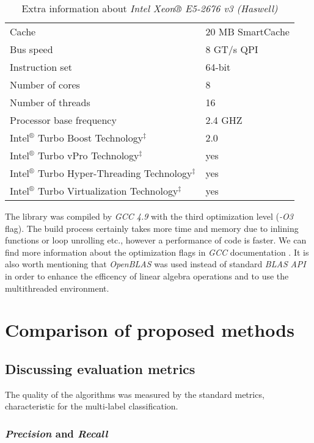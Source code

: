 \begin{table}[h]
\centering
\caption{Extra information about \textit{Intel Xeon® E5-2676 v3 (Haswell)}}
\label{tab:cpu}
    \begin{tabular}{l|l}
    & \\ \hline \hline
    Cache & 20 MB SmartCache \\
    Bus speed & 8 GT/s QPI \\
    Instruction set & 64-bit \\
    Number of cores & 8 \\
    Number of threads & 16 \\
    Processor base frequency & 2.4 GHZ \\
    Intel$^{®}$ Turbo Boost Technology$^{‡}$ & 2.0 \\
    Intel$^{®}$ Turbo vPro Technology$^{‡}$ & yes \\ 
    Intel$^{®}$ Turbo Hyper-Threading Technology$^{‡}$ & yes \\
    Intel$^{®}$ Turbo Virtualization Technology$^{‡}$ & yes
    \end{tabular}
\end{table}

The library was compiled by \textit{GCC 4.9} with the third optimization level (\textit{-O3} flag). The build process certainly takes more time and memory due to inlining functions or loop unrolling etc., however a performance of code is faster. We can find more information about the optimization flags in \textit{GCC} documentation \cite{Opt}. It is also worth mentioning that \textit{OpenBLAS} was used instead of standard \textit{BLAS} \textit{API} in order to enhance the efficency of linear algebra operations and to use the multithreaded environment. 

\section{Comparison of proposed methods}
\subsection{Discussing evaluation metrics}


The quality of the algorithms was measured by the standard metrics, characteristic for the multi-label classification.

\subsubsection{\textit{Precision} and \textit{Recall}} 


